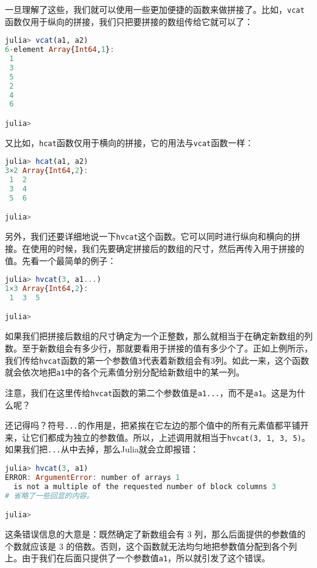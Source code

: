 一旦理解了这些，我们就可以使用一些更加便捷的函数来做拼接了。比如，\verb`vcat`函数仅用于纵向的拼接，我们只把要拼接的数组传给它就可以了：

\begin{lstlisting}[language=julia]
julia> vcat(a1, a2)
6-element Array{Int64,1}:
 1
 3
 5
 2
 4
 6

julia>
\end{lstlisting}

又比如，\verb`hcat`函数仅用于横向的拼接，它的用法与\verb`vcat`函数一样：

\begin{lstlisting}[language=julia]
julia> hcat(a1, a2)
3×2 Array{Int64,2}:
 1  2
 3  4
 5  6

julia> 
\end{lstlisting}

另外，我们还要详细地说一下\verb`hvcat`这个函数。它可以同时进行纵向和横向的拼接。在使用的时候，我们先要确定拼接后的数组的尺寸，然后再传入用于拼接的值。先看一个最简单的例子：

\begin{lstlisting}[language=julia]
julia> hvcat(3, a1...)
1×3 Array{Int64,2}:
 1  3  5

julia> 
\end{lstlisting}

如果我们把拼接后数组的尺寸确定为一个正整数，那么就相当于在确定新数组的列数。至于新数组会有多少行，那就要看用于拼接的值有多少个了。正如上例所示，我们传给\verb`hvcat`函数的第一个参数值\verb`3`代表着新数组会有3列。如此一来，这个函数就会依次地把\verb`a1`中的各个元素值分别分配给新数组中的某一列。

注意，我们在这里传给\verb`hvcat`函数的第二个参数值是\verb`a1...`，而不是\verb`a1`。这是为什么呢？

还记得吗？符号\verb`...`的作用是，把紧挨在它左边的那个值中的所有元素值都平铺开来，让它们都成为独立的参数值。所以，上述调用就相当于\verb`hvcat(3, 1, 3, 5)`。如果我们把\verb`...`从中去掉，那么Julia就会立即报错：

\begin{lstlisting}[language=julia]
julia> hvcat(3, a1)
ERROR: ArgumentError: number of arrays 1 
  is not a multiple of the requested number of block columns 3
# 省略了一些回显的内容。

julia> 
\end{lstlisting}

这条错误信息的大意是：既然确定了新数组会有 3 列，那么后面提供的参数值的个数就应该是 3 的倍数。否则，这个函数就无法均匀地把参数值分配到各个列上。由于我们在后面只提供了一个参数值\verb`a1`，所以就引发了这个错误。

